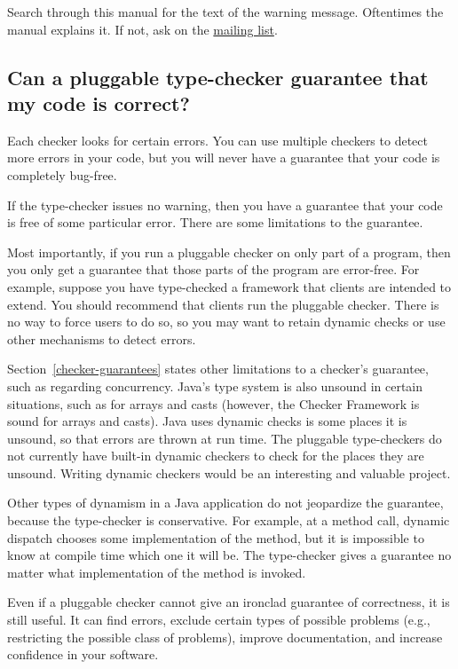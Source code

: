 Search through this manual for the text of the warning message.
Oftentimes the manual explains it.  If not, ask on the \href{https://groups.google.com/forum/#!forum/checker-framework-discuss}{mailing list}.


\subsection{Can a pluggable type-checker guarantee that my code is correct?\label{faq-no-absolute-guarantee}}

Each checker looks for certain errors.  You can use multiple checkers to
detect more errors in your code, but you will never have a guarantee that
your code is completely bug-free.

If the type-checker issues no warning, then you have a guarantee that your
code is free of some particular error.  There are some limitations to the
guarantee.

Most importantly, if you run a pluggable checker on only part of a program, then
you only get a guarantee that those parts of the program are error-free.
For example, suppose you have type-checked a framework that clients
are intended to extend.  You should recommend that clients
run the pluggable checker.  There is no way to force users to do so, so you
may want to retain dynamic checks or use other mechanisms to detect errors.

Section~\ref{checker-guarantees} states other limitations to a checker's
guarantee, such as regarding concurrency.  Java's type system is also
unsound in certain situations, such as for arrays and casts (however, the
Checker Framework is sound for arrays and casts).  Java uses dynamic checks
is some places it is unsound, so that errors are thrown at run time.  The
pluggable type-checkers do not currently have built-in dynamic checkers to
check for the places they are unsound.
Writing dynamic checkers would be an interesting and valuable project.

Other types of dynamism in a Java application do not jeopardize the
guarantee, because the type-checker is conservative.  For example, at a
method call, dynamic dispatch chooses some implementation of the method,
but it is impossible to know at compile time which one it will be.  The
type-checker gives a guarantee no matter what implementation of the method
is invoked.


Even if a pluggable checker cannot give an ironclad
guarantee of correctness, it is still useful.  It can find errors,
exclude certain types of possible problems (e.g., restricting the
possible class of problems), improve documentation, and increase confidence
in your software.


